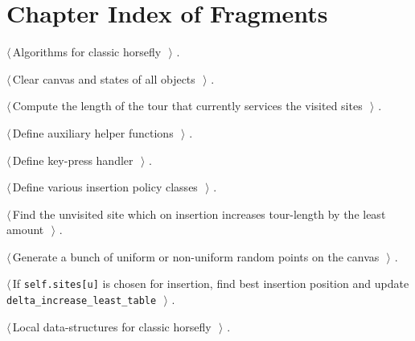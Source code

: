 \documentclass[11.5pt]{report}
\begin{document}
\section{Chapter Index of Fragments}

{\small\begin{list}{}{\setlength{\itemsep}{-\parsep}\setlength{\itemindent}{-\leftmargin}}
\item $\langle\,$Algorithms for classic horsefly\nobreak\ {\footnotesize {}}$\,\rangle$ {\footnotesize {\NWtxtRefIn} .}
\item $\langle\,$Clear canvas and states of all objects\nobreak\ {\footnotesize {}}$\,\rangle$ {\footnotesize {\NWtxtRefIn} .}
\item $\langle\,$Compute the length of the tour that currently services the visited sites\nobreak\ {\footnotesize {}}$\,\rangle$ {\footnotesize {\NWtxtRefIn} .}
\item $\langle\,$Define auxiliary helper functions\nobreak\ {\footnotesize {}}$\,\rangle$ {\footnotesize {\NWtxtRefIn} .}
\item $\langle\,$Define key-press handler\nobreak\ {\footnotesize {}}$\,\rangle$ {\footnotesize {\NWtxtRefIn} .}
\item $\langle\,$Define various insertion policy classes\nobreak\ {\footnotesize {}}$\,\rangle$ {\footnotesize {\NWtxtRefIn} .}
\item $\langle\,$Find the unvisited site which on insertion increases tour-length by the least amount\nobreak\ {\footnotesize {}}$\,\rangle$ {\footnotesize {\NWtxtRefIn} .}
\item $\langle\,$Generate a bunch of uniform or non-uniform random points on the canvas\nobreak\ {\footnotesize {}}$\,\rangle$ {\footnotesize {\NWtxtRefIn} .}
\item $\langle\,$If \texttt{self.sites[u]} is chosen for insertion, find best insertion position and update \texttt{delta\_increase\_least\_table}\nobreak\ {\footnotesize {}}$\,\rangle$ {\footnotesize {\NWtxtRefIn} .}
\item $\langle\,$Local data-structures for classic horsefly\nobreak\ {\footnotesize {}}$\,\rangle$ {\footnotesize {\NWtxtRefIn} .}

\end{list}}
\end{document}
